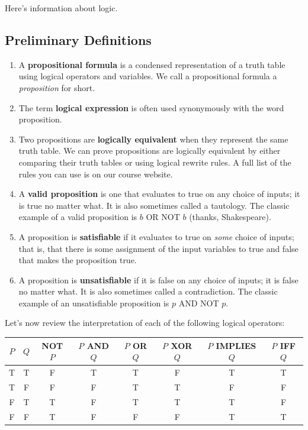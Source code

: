 \documentclass[12pt,letterpaper]{article}
\begin{document}
Here's information about logic.

    \subsection{Preliminary Definitions}
    
    \begin{enumerate}
      
   	\item A \textbf{propositional formula} is a condensed representation of a truth table using logical operators and variables. We call a propositional formula a \textit{proposition} for short. 
	
	\item The term \textbf{logical expression} is often used synonymously with the word proposition. 
	
	\item Two propositions are \textbf{logically equivalent} when they represent the same truth table. We can prove propositions are logically equivalent by either comparing their truth tables or using logical rewrite rules. A full list of the rules you can use is on our course website.
	
	\item A \textbf{valid proposition} is one that evaluates to true on any choice of inputs; it is true no matter what. It is also sometimes called a tautology. The classic example of a valid proposition is $b$ OR NOT $b$ (thanks, Shakespeare). 
	
	\item A proposition is \textbf{satisfiable} if it evaluates to true on \textit{some} choice of inputs; that is, that there is some assignment of the input variables to true and false that makes the proposition true.
	
	\item A proposition is \textbf{unsatisfiable} if it is false on any choice of inputs; it is false no matter what. It is also sometimes called a contradiction. The classic example of an unsatisfiable proposition is $p$ AND NOT $p$. 
\end{enumerate}

Let's now review the interpretation of each of the following logical operators:    

\begin{tabular}{c|c|c|c|c|c|c|c}
 $P$ & $Q$ & NOT $P$ & $P$ AND $Q$ & $P$ OR $Q$ & $P$ XOR $Q$ & $P$ IMPLIES $Q$ & $P$ IFF $Q$\\
\hline
T & T & F & T & T & F & T & T\\
T & F & F & F & T & T & F & F\\
F & T & T & F & T & T & T & F\\
F & F & T & F & F & F & T & T
\end{tabular}
\end{document}
